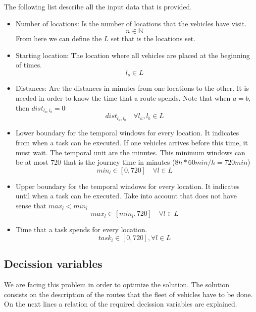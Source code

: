 \documentclass[]{report}
\begin{document}
The following list describe all the input data that is provided.
\begin{itemize}
	\item Number of locations: Is the number of locations that the vehicles have visit.
	$$
	n \in \mathbb{N}
	$$ 
	From here we can define the $L$ set that is the locations set.
	\item Starting location: The location where all vehicles are placed at the beginning of times.
	$$
	l_{s} \in L
	$$
	\item Distances: Are the distances in minutes from one locations to the other. It is needed in order to know the time that a route spends. Note that when $a=b$, then $dist_{l_{a},l_{b}}=0$
	$$
	dist_{l_{a},l_{b}} \quad \forall l_{a},l_{b} \in L
	$$
	\item Lower boundary for the temporal windows for every location. It indicates from when a task can be executed. If one vehicles arrives before this time, it must wait. The temporal unit are the minutes. This minimum windows can be at most 720 that is the journey time in minutes ($8h*60min/h = 720min$)
	$$
	min_{l} \in [0, 720] \quad \forall l \in L
	$$
	\item Upper boundary for the temporal windows for every location. It indicates until when a task can be executed. Take into account that does not have sense that $max_{l} < min_{l}$
	$$
	max_{l} \in [min_{l}, 720] \quad \forall l \in L
	$$
	\item Time that a task spends for every location.
	$$
	task_{l} \in [0, 720], \forall l \in L
	$$
\end{itemize}
	
\subsection{Decission variables}

We are facing this problem in order to optimize the solution. The solution consists on the description of the routes that the fleet of vehicles have to be done. On the next lines a relation of the required decission variables are explained.
\end{document}
